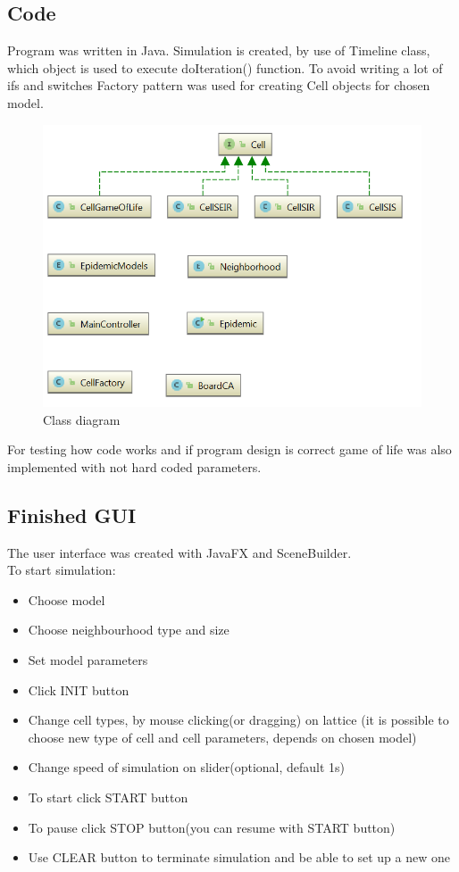 \documentclass[a4paper, 11pt]{article}
\begin{document}
\subsection{Code}
Program was written in Java. Simulation is created, by use of Timeline class, which object is used to execute doIteration() function. To avoid writing a lot of ifs and switches Factory pattern was used for creating Cell objects for chosen model.
\begin{figure}[H]
\includegraphics[width=\textwidth]{klasy.PNG} 
\caption{Class diagram}
\end{figure}



For testing how code works and if program design is correct game of life was also implemented with not hard coded parameters.

\subsection{Finished GUI}
The user interface was created with JavaFX and SceneBuilder.\\
To start simulation:
\begin{itemize}
\item Choose model
\item Choose neighbourhood type and size
\item Set model parameters
\item Click INIT button
\item Change cell types, by mouse clicking(or dragging) on lattice (it is possible to choose new type of cell and cell parameters, depends on chosen model)
\item Change speed of simulation on slider(optional, default 1s)
\item To start click START button
\item To pause click STOP button(you can resume with START button)
\item Use CLEAR button to terminate simulation and be able to set up a new one

\end{itemize}
\end{document}
